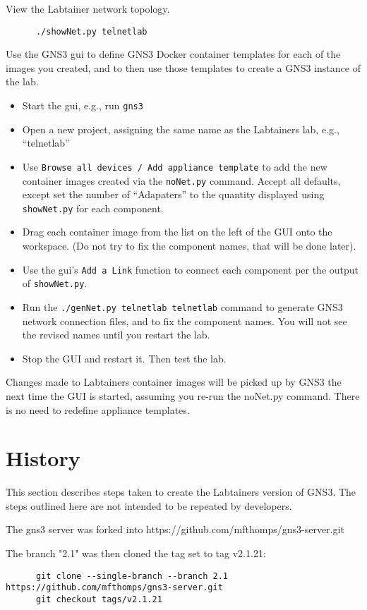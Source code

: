 \documentclass[12pt]{article}
\begin{document}
View the Labtainer network topology.
\begin{verbatim}
      ./showNet.py telnetlab
\end{verbatim}
\noindent Use the GNS3 gui to define GNS3 Docker container templates for each of the 
images you created, and to then use those templates to create a GNS3 instance of 
the lab.
\begin{itemize}
	\item Start the gui, e.g., run {\tt gns3}
	\item Open a new project, assigning the same name as the Labtainers lab, e.g., ``telnetlab''
	\item Use {\tt Browse all devices / Add appliance template} to add the new container images created
		via the {\tt noNet.py} command.  Accept all defaults, except set the number of ``Adapaters'' to
		the quantity displayed using {\tt showNet.py} for each component.
	\item Drag each container image from the list on the left of the GUI onto the workspace.  (Do not try to fix
		the component names, that will be done later).
	\item Use the gui's {\tt Add a Link} function to connect each component per the output of {\tt showNet.py}.
	\item Run the {\tt ./genNet.py telnetlab telnetlab} command to generate GNS3 network connection files, and to
		fix the component names.  You will not see the revised names until you restart the lab.
	\item Stop the GUI and restart it.  Then test the lab.
\end{itemize}
Changes made to Labtainers container images will be picked up by GNS3 the next time the GUI is started,
assuming you re-run the noNet.py command.  There is no need to redefine appliance templates.

\section{History}
This section describes steps taken to create the Labtainers version of GNS3.
The steps outlined here are not intended to be repeated by developers.

The gns3 server was forked into https://github.com/mfthomps/gns3-server.git

The branch "2.1" was then cloned the tag set to tag v2.1.21:
\small
\begin{verbatim}
      git clone --single-branch --branch 2.1 https://github.com/mfthomps/gns3-server.git
      git checkout tags/v2.1.21
\end{verbatim}
\end{document}
